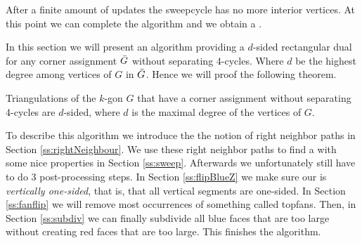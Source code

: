   After a finite amount of updates the sweepcycle has no more interior vertices. At this point we can complete the algorithm and we obtain a \rel.

  In this section we will present an algorithm providing a $d$-sided rectangular dual for any corner assignment $\bar{G}$ without separating $4$-cycles. Where $d$ be the highest degree among vertices of $G$ in $\bar{G}$.  Hence we will proof the following theorem.

  \begin{thrm}
  \label{th:dsided}
  Triangulations of the $k$-gon $G$ that have a corner assignment without separating 4-cycles are $d$-sided, where $d$ is the maximal degree of the vertices of $G$.
  \end{thrm}

  To describe this algorithm we introduce the the notion of right neighbor paths in Section \ref{ss:rightNeighbour}.  We use these right neighbor paths to find a \rel with some nice properties in Section \ref{ss:sweep}. Afterwards we unfortunately still have to do $3$ post-processing steps. In Section \ref{ss:flipBlueZ} we make sure our \rel is \emph{vertically one-sided}, that is, that all vertical segments are one-sided. In Section \ref{ss:fanflip} we will remove most occurrences of something called topfans. Then, in Section \ref{ss:subdiv} we can finally subdivide all blue faces that are too large without creating red faces that are too large. This finishes the algorithm.
